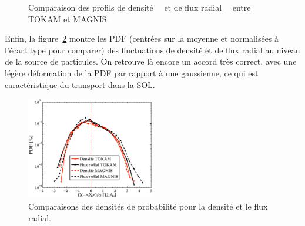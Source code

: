 \begin{refsection}
\begin{figure}[!htbp]
  \centering
    \caption{Comparaison des profils de
    densité~~ et de flux
    radial~~ entre TOKAM et MAGNIS.}
    \label{4-TokamProfils}
\end{figure}

Enfin, la figure~\ref{4-TokamPDFDensite} montre les PDF (centrées sur la
moyenne et normalisées à l'écart type pour comparer) des fluctuations de densité
et de flux radial au niveau de la source de particules.
On retrouve là encore un accord très correct, avec une légère déformation de la
PDF par rapport à une gaussienne, ce qui est caractéristique du transport dans
la SOL.

 \begin{figure}[!htbp]
\centering
\includegraphics[width=0.5\textwidth]{figures/4-TokamPDFDensite.eps}
{\caption{Comparaisons des densités de probabilité pour la densité et
le flux radial.}
\label{4-TokamPDFDensite}}
\end{figure}


\end{refsection}
